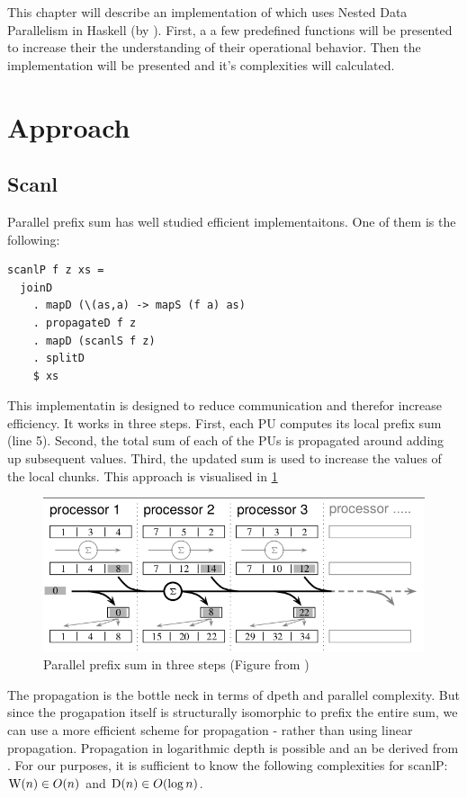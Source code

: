 

  This chapter will describe an implementation of \algo which uses
  Nested Data Parallelism in Haskell (by \cite{Harness2008}).
  First, a a few predefined functions will be presented to
  increase their the understanding of their operational behavior.
  Then the implementation will be presented and it's complexities will
  calculated.
  
  \section{Approach}
  
    \subsection{Scanl}
      Parallel prefix sum has well studied efficient implementaitons. One of them
      is the following:
      \begin{lstlisting}   
scanlP f z xs =
  joinD
    . mapD (\(as,a) -> mapS (f a) as)
    . propagateD f z
    . mapD (scanlS f z)
    . splitD
    $ xs
      \end{lstlisting}
      This implementatin is designed to reduce communication
      and therefor increase efficiency. It works in three steps.
      First, each PU computes its local prefix sum (line 5).
      Second, the total sum of each of the PUs is propagated
      around adding up subsequent values.
      Third, the updated sum is used to increase the values of the local chunks.
      This approach is visualised in \ref{figure:scanlPsteps}
      
      \begin{figure}[h!]
          \includegraphics[width=\linewidth]{scanlP-three-steps.png}
          \caption{Parallel prefix sum in three steps (Figure from \cite{DistTypes1999}) }
          \label{figure:scanlPsteps}
      \end{figure}
      The propagation is the bottle neck in terms of dpeth and parallel complexity.
      But since the progapation itself is structurally isomorphic to prefix the entire sum,
      we can use a more efficient scheme for propagation - rather than using linear propagation.
      Propagation in logarithmic depth is possible and an be derived from \cite{Scanl1980}.
      For our purposes, it is sufficient to know the following complexities for scanlP:
      $\textrm{W}(n) \in O(n)$ and $\textrm{D}(n) \in O(\log n)$.

